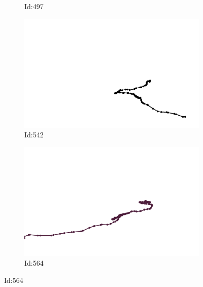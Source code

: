 \documentclass[12pt,twoside]{report}
\begin{document}
\begin{figure}
\begin{subfigure}[b]{0.20\textwidth}
\caption{Id:497}
\end{subfigure}
\begin{subfigure}[b]{0.20\textwidth}
\centering
\includegraphics[width=\textwidth]{../../trajectories/542.png}
\caption{Id:542}
\end{subfigure}
\begin{subfigure}[b]{0.20\textwidth}
\centering
\includegraphics[width=\textwidth]{../../trajectories/564.png}
\caption{Id:564}
\end{subfigure}
\end{figure}
\end{document}
